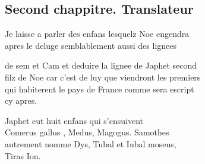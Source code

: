 \documentclass[12pt]{article}
\begin{document}
\subsection*{Second chappitre. Translateur}


Je laisse a parler des enfans lesquelz Noe
            engendra\\
apres le deluge semblablement aussi des lignees



\newpage
de sem et
            Cam et deduire la lignee de Japhet second\\
filz de Noe car
          c'est de luy que viendront les premiers\\
qui habiterent le pays de France comme
          sera escript\\
cy apres.



Japhet eut huit enfans qui s'ensuivent\\
Comerus gallus ,  Medus,  Magogus.
            Samothes\\
autrement nomme
            Dys, 
            Tubal et Iubal moseus,\\
Tiras Ion.
\end{document}
